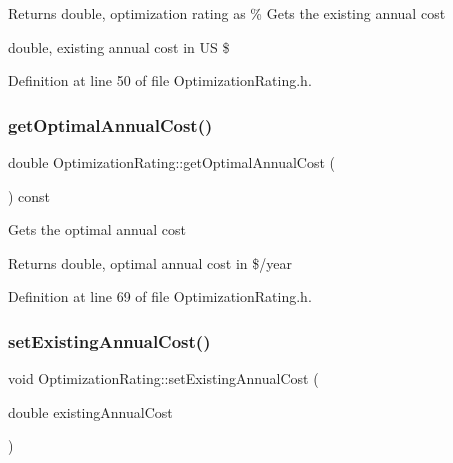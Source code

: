 \begin{DoxyReturn}{Returns}
double, optimization rating as \% Gets the existing annual cost

double, existing annual cost in US \$ 
\end{DoxyReturn}


Definition at line 50 of file Optimization\+Rating.\+h.

\mbox{\label{class_optimization_rating_ada9718f5369be2b14b4b0c07d4fa9510}} 
\subsubsection{\texorpdfstring{get\+Optimal\+Annual\+Cost()}{getOptimalAnnualCost()}}
{\footnotesize\ttfamily double Optimization\+Rating\+::get\+Optimal\+Annual\+Cost (\begin{DoxyParamCaption}{ }\end{DoxyParamCaption}) const\hspace{0.3cm}{\ttfamily [inline]}}

Gets the optimal annual cost

\begin{DoxyReturn}{Returns}
double, optimal annual cost in \$/year 
\end{DoxyReturn}


Definition at line 69 of file Optimization\+Rating.\+h.

\mbox{\label{class_optimization_rating_a167d4626ab234baf7facce5fe8e4b32d}} 
\subsubsection{\texorpdfstring{set\+Existing\+Annual\+Cost()}{setExistingAnnualCost()}}
{\footnotesize\ttfamily void Optimization\+Rating\+::set\+Existing\+Annual\+Cost (\begin{DoxyParamCaption}\item[{double}]{existing\+Annual\+Cost }\end{DoxyParamCaption})\hspace{0.3cm}{\ttfamily [inline]}}

